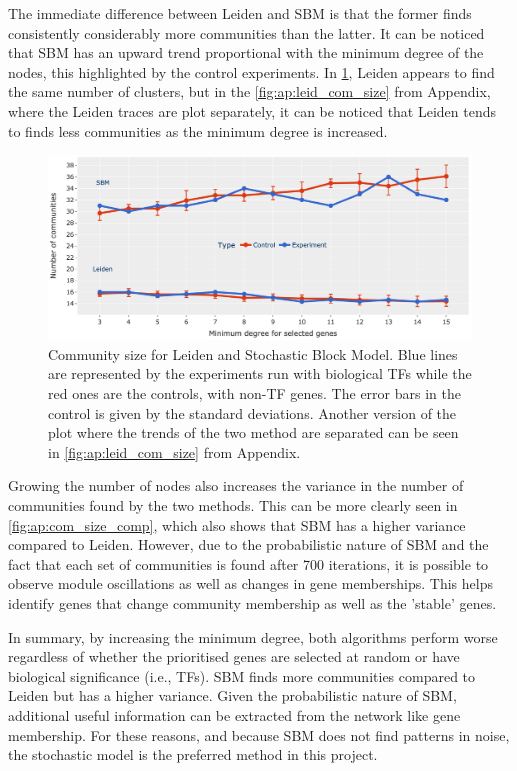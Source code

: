 The immediate difference between Leiden and SBM is that the former finds consistently considerably more communities than the latter. It can be noticed that SBM has an upward trend proportional with the minimum degree of the nodes, this highlighted by the control experiments. In \cref{fig:N_I:comp_size_com_det}, Leiden appears to find the same number of clusters, but in the \cref{fig:ap:leid_com_size} from Appendix, where the Leiden traces are plot separately, it can be noticed that Leiden tends to finds less communities as the minimum degree is increased. 

\begin{figure}[!t]   
    \centering
    \includegraphics[width=1.0\textwidth,height=1.0\textheight,keepaspectratio]{Sections/Network_I/Resources/selective_pruning/com_comp/sbm_Leiden_combNum.png}
      \caption{Community size for Leiden and Stochastic Block Model. Blue lines are represented by the experiments run with biological TFs while the red ones are the controls, with non-TF genes. The error bars in the control is given by the standard deviations. Another version of the plot where the trends of the two method are separated can be seen in \cref{fig:ap:leid_com_size} from Appendix.}
    \label{fig:N_I:comp_size_com_det}
\end{figure}

Growing the number of nodes also increases the variance in the number of communities found by the two methods. This can be more clearly seen in \cref{fig:ap:com_size_comp}, which also shows that SBM has a higher variance compared to Leiden. However, due to the probabilistic nature of SBM and the fact that each set of communities is found after 700 iterations, it is possible to observe module oscillations as well as changes in gene memberships. This helps identify genes that change community membership as well as the 'stable' genes.

In summary, by increasing the minimum degree, both algorithms perform worse regardless of whether the prioritised genes are selected at random or have biological significance (i.e., TFs). SBM finds more communities compared to Leiden but has a higher variance. Given the probabilistic nature of SBM, additional useful information can be extracted from the network like gene membership. For these reasons, and because SBM does not find patterns in noise, the stochastic model is the preferred method in this project.





